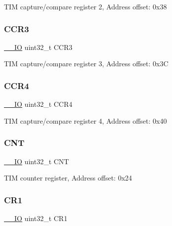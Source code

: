 T\+IM capture/compare register 2, Address offset\+: 0x38 \mbox{\label{struct_t_i_m___type_def_a27a478cc47a3dff478555ccb985b06a2}} 
\subsubsection{\texorpdfstring{C\+C\+R3}{CCR3}}
{\footnotesize\ttfamily \mbox{\hyperlink{core__sc300_8h_aec43007d9998a0a0e01faede4133d6be}{\+\_\+\+\_\+\+IO}} uint32\+\_\+t C\+C\+R3}

T\+IM capture/compare register 3, Address offset\+: 0x3C \mbox{\label{struct_t_i_m___type_def_a85fdb75569bd7ea26fa48544786535be}} 
\subsubsection{\texorpdfstring{C\+C\+R4}{CCR4}}
{\footnotesize\ttfamily \mbox{\hyperlink{core__sc300_8h_aec43007d9998a0a0e01faede4133d6be}{\+\_\+\+\_\+\+IO}} uint32\+\_\+t C\+C\+R4}

T\+IM capture/compare register 4, Address offset\+: 0x40 \mbox{\label{struct_t_i_m___type_def_a6095a27d764d06750fc0d642e08f8b2a}} 
\subsubsection{\texorpdfstring{C\+NT}{CNT}}
{\footnotesize\ttfamily \mbox{\hyperlink{core__sc300_8h_aec43007d9998a0a0e01faede4133d6be}{\+\_\+\+\_\+\+IO}} uint32\+\_\+t C\+NT}

T\+IM counter register, Address offset\+: 0x24 \mbox{\label{struct_t_i_m___type_def_ab0ec7102960640751d44e92ddac994f0}} 
\subsubsection{\texorpdfstring{C\+R1}{CR1}}
{\footnotesize\ttfamily \mbox{\hyperlink{core__sc300_8h_aec43007d9998a0a0e01faede4133d6be}{\+\_\+\+\_\+\+IO}} uint32\+\_\+t C\+R1}

